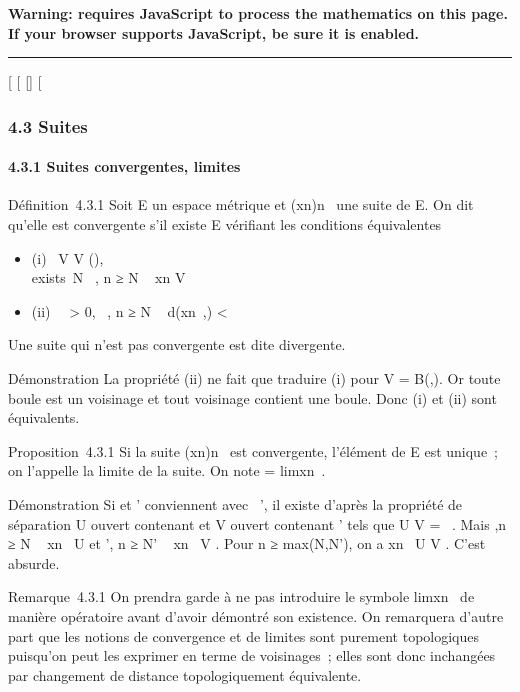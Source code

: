 \textbf{Warning: 
requires JavaScript to process the mathematics on this page.\\ If your
browser supports JavaScript, be sure it is enabled.}

\begin{center}\rule{3in}{0.4pt}\end{center}

{[}
{[}
{[}{]}
{[}

\subsubsection{4.3 Suites}

\paragraph{4.3.1 Suites convergentes, limites}

Définition~4.3.1 Soit E un espace métrique et
(xn)n\in{}~ une suite de E. On dit qu'elle est
convergente s'il existe \ell \in E vérifiant les conditions équivalentes

\begin{itemize}
\itemsep1pt\parskip0pt
\item
  (i) \forall~V \in V (\ell), \\exists~N
  \in {}~, n ≥ N \rigtharrow~ xn \in V
\item
  (ii) \forall~~\epsilon \textgreater{} 0,
  \existsN \in {}~, n ≥ N \rigtharrow~ d(xn~,\ell)
  \textless{} \epsilon
\end{itemize}

Une suite qui n'est pas convergente est dite divergente.

Démonstration La propriété (ii) ne fait que traduire (i) pour V =
B(\ell,\epsilon). Or toute boule est un voisinage et tout voisinage contient une
boule. Donc (i) et (ii) sont équivalents.

Proposition~4.3.1 Si la suite (xn)n\in{}~ est
convergente, l'élément \ell de E est unique~; on l'appelle la limite de la
suite. On note \ell = limxn~.

Démonstration Si \ell et \ell' conviennent avec \ell\neq~\ell', il existe d'après la
propriété de séparation U ouvert contenant \ell et V ouvert contenant \ell'
tels que U \bigcap V = \varnothing~. Mais
\existsN,\quad n ≥ N \rigtharrow~ xn~ \in
U et \existsN', n ≥ N' \rigtharrow~ xn~ \in V . Pour n
≥ max(N,N'), on a xn~ \in U \bigcap V . C'est
absurde.

Remarque~4.3.1 On prendra garde à ne pas introduire le symbole
limxn~ de manière opératoire avant
d'avoir démontré son existence. On remarquera d'autre part que les
notions de convergence et de limites sont purement topologiques
puisqu'on peut les exprimer en terme de voisinages~; elles sont donc
inchangées par changement de distance topologiquement équivalente.

